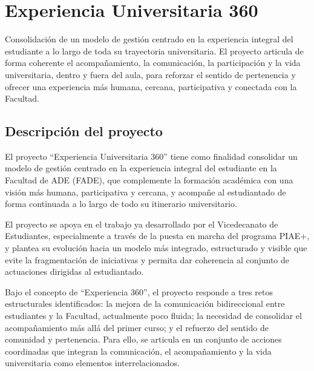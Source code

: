 \documentclass[11pt,a4paper]{scrreprt}
\begin{document}
\clearpage

\chapter[Experiencia Universitaria 360]{\textcolor{e360color}{Experiencia Universitaria 360}}
\begin{tcolorbox}[descbox]
\small Consolidación de un modelo de gestión centrado en la experiencia integral del estudiante a lo largo de toda su trayectoria universitaria. El proyecto articula de forma coherente el acompañamiento, la comunicación, la participación y la vida universitaria, dentro y fuera del aula, para reforzar el sentido de pertenencia y ofrecer una experiencia más humana, cercana, participativa y conectada con la Facultad.
\end{tcolorbox}
\section{Descripción del proyecto}

\small
El proyecto “Experiencia Universitaria 360” tiene como finalidad consolidar un modelo de gestión centrado en la experiencia integral del estudiante en la Facultad de ADE (FADE), que complemente la formación académica con una visión más humana, participativa y cercana, y acompañe al estudiantado de forma continuada a lo largo de todo su itinerario universitario.

El proyecto se apoya en el trabajo ya desarrollado por el Vicedecanato de Estudiantes, especialmente a través de la puesta en marcha del programa PIAE+, y plantea su evolución hacia un modelo más integrado, estructurado y visible que evite la fragmentación de iniciativas y permita dar coherencia al conjunto de actuaciones dirigidas al estudiantado.

Bajo el concepto de “Experiencia 360”, el proyecto responde a tres retos estructurales identificados: la mejora de la comunicación bidireccional entre estudiantes y la Facultad, actualmente poco fluida; la necesidad de consolidar el acompañamiento más allá del primer curso; y el refuerzo del sentido de comunidad y pertenencia. Para ello, se articula en un conjunto de acciones coordinadas que integran la comunicación, el acompañamiento y la vida universitaria como elementos interrelacionados.
\end{document}
